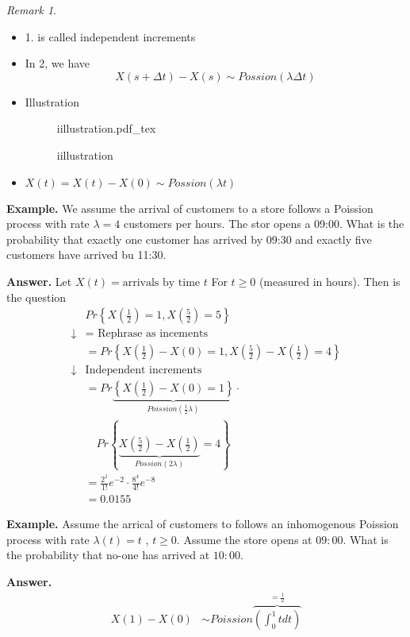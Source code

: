 \documentclass{article}
\newcommand{\incfig}[2][1]{%
\def\svgwidth{#1\columnwidth}
{#2.pdf_tex} } \pdfsuppresswarningpagegroup=1
\theoremstyle{remark}
\newtheorem*{remark}{Remark}
\newcommand{\newpara}
  {
  \vskip 0.4cm
  }
\begin{document}
\begin{remark}
  \begin{itemize}
    \item 1. is called independent increments 
    \item In 2, we have \[
        X\left( s+ \Delta t \right) - X\left( s \right) \sim Possion(\lambda  \Delta t)
    \] 
  \item Illustration 
\begin{figure}[ht]
    \centering
    \incfig{iillustration}
    \caption{iillustration}
    \label{fig:iillustration}
\end{figure}
\item $X\left( t \right) = X\left( t \right) - X\left( 0 \right) \sim Possion(\lambda t)$
  \end{itemize}
\end{remark}
\begin{tcolorbox}
  \textbf{Example.} We assume the arrival of customers to a store follows a Poission process with rate $\lambda  = 4$ customers per hours. The stor opens a 09:00. What is the probability that exactly one customer has arrived by 09:30 and exactly five customers have arrived bu 11:30.
  
  \newpara
  \textbf{Answer.} Let $X\left( t \right) = \text{arrivals by time } t$ For $t\ge 0$ (measured in hours). Then is the question \[
    \begin{split}
   &  Pr \left \{ X\left( \frac{1}{2} \right) = 1,     X\left( \frac{5}{2}  \right) = 5 \right \}     \\
  \downarrow   &  = \text{ Rephrase as incements } \\
               &= Pr \left \{ X\left( \frac{1}{2} \right) - X\left( 0 \right) = 1 , X\left( \frac{5}{2}  \right) - X\left( \frac{1}{2} \right) = 4  \right \}  \\
               \downarrow  &  \text{Independent increments} \\
                           &= Pr  \underbrace{\left \{ X\left( \frac{1}{2} \right)- X\left( 0 \right) = 1 \right \}}_{ Poission(\frac{1}{2} \lambda )}  \cdot \\
                            & \quad     Pr \left \{  \underbrace{ X\left( \frac{5}{2} \right) - X\left( \frac{1}{2} \right)}_{Possion(2 \lambda )}  = 4 \right\}  \\ 
&= \frac{2^{1}}{1!} e^{-2}  \cdot \frac{8^{4}}{4!} e^{-8}   \\
    &= 0.0155 
    \end{split} 
  \] 
\end{tcolorbox}
\begin{tcolorbox}
  \textbf{Example.} Assume the arrical of customers to follows an inhomogenous Poission process with rate $\lambda \left( t \right)  =t$ , $t\ge 0 $. Assume the store opens at $09:00$. What is the probability that no-one has arrived at $10:00$.
   
  \newpara
  \textbf{Answer.} \[
    \begin{split}
  X\left( 1 \right) - X\left( 0 \right)  & \sim Poission\overbrace{\left( \int_{0}^{ 1}  t dt  \right)}^{ = \frac{1}{2}}   \\
    \end{split} 
  \]  
\end{tcolorbox}
\newpage
\end{document}
